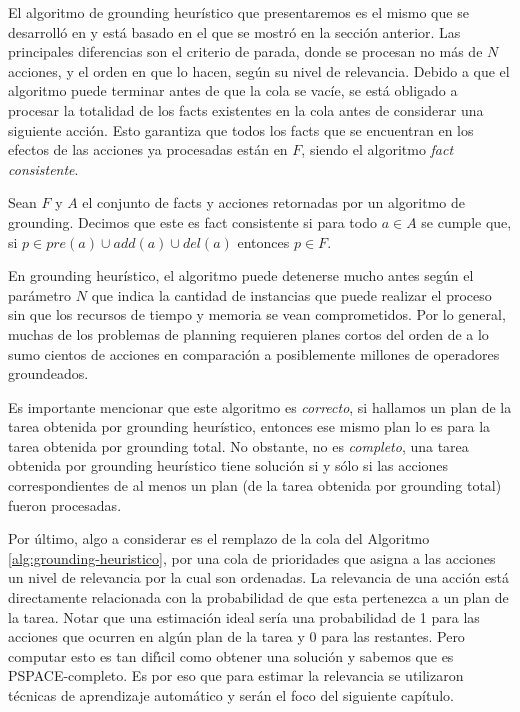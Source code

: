 El algoritmo de grounding heurístico que presentaremos es el mismo que se
desarrolló en \citep{Gnad_Torralba_Dominguez_Areces_Bustos_2019} y está basado
en el que se mostró en la sección anterior. Las principales diferencias son el
criterio de parada, donde se procesan no más de $N$ acciones, y el orden en que
lo hacen, según su nivel de relevancia. Debido a que el algoritmo puede terminar
antes de que la cola se vacíe, se está obligado a procesar la totalidad de los
facts existentes en la cola antes de considerar una siguiente acción. Esto
garantiza que todos los facts que se encuentran en los efectos de las acciones
ya procesadas están en $F$, siendo el algoritmo \emph{fact consistente}.

\begin{mydef}
    Sean $F$ y $A$ el conjunto de facts y acciones retornadas por un algoritmo
    de grounding. Decimos que este es fact consistente si para todo $a \in A$ se
    cumple que, si $p \in pre(a) \cup add(a) \cup del(a)$ entonces $p \in F$.
\end{mydef}

En grounding heurístico, el algoritmo puede detenerse mucho antes según el
parámetro $N$ que indica la cantidad de instancias que puede realizar el proceso
sin que los recursos de tiempo y memoria se vean comprometidos. Por lo general,
muchas de los problemas de planning requieren planes cortos del orden de a lo
sumo cientos de acciones en comparación a posiblemente millones de operadores
groundeados.

Es importante mencionar que este algoritmo es \emph{correcto}, si hallamos un
plan de la tarea obtenida por grounding heurístico, entonces ese mismo plan lo
es para la tarea obtenida por grounding total. No obstante, no es
\emph{completo}, una tarea obtenida por grounding heurístico tiene solución si y
sólo si las acciones correspondientes de al menos un plan (de la tarea obtenida
por grounding total) fueron procesadas.

Por último, algo a considerar es el remplazo de la cola del Algoritmo
\ref{alg:grounding-heuristico}, por una cola de prioridades que asigna a las
acciones un nivel de relevancia por la cual son ordenadas. La relevancia de una
acción está directamente relacionada con la probabilidad de que esta pertenezca
a un plan de la tarea. Notar que una estimación ideal sería una probabilidad de
1 para las acciones que ocurren en algún plan de la tarea y 0 para las
restantes. Pero computar esto es tan difı́cil como obtener una solución y
sabemos que es PSPACE-completo. Es por eso que para estimar la relevancia se
utilizaron técnicas de aprendizaje automático y serán el foco del siguiente
capítulo.
